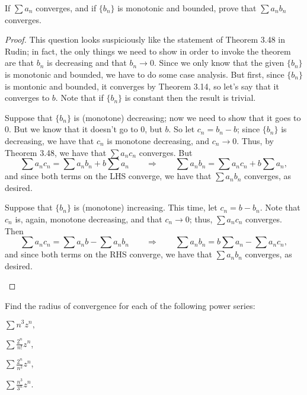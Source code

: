 \documentclass{assignment}
\begin{document}
\begin{question}[8]
  If $\sum a_n$ converges, and if $\{b_n\}$ is monotonic and bounded, prove that $\sum a_n b_n$ converges.
\end{question}
\begin{proof}
  This question looks suspiciously like the statement of Theorem 3.48 in Rudin; in fact, the only 
  things we need to show in order to invoke the theorem are that $b_n$ is decreasing and that $b_n
  \to 0$. Since we only know that the given $\{b_n\}$ is monotonic and bounded, we have to do some
  case analysis. But first, since $\{b_n\}$ is montonic and bounded, it converges by Theorem 3.14, 
  so let's say that it converges to $b$. Note that if $\{b_n\}$ is constant then the result is
  trivial.

  \begin{qparts}
    \item Suppose that $\{b_n\}$ is (monotone) decreasing; now we need to show that it goes to 0. But
      we know that it doesn't go to 0, but $b$. So let $c_n = b_n - b$; since $\{b_n\}$ is decreasing,
      we have that $c_n$ is monotone decreasing, and $c_n \to 0$. Thus, by Theorem 3.48, we have that
      $\sum a_n c_n$ converges. But $$\sum a_n c_n = \sum a_n b_n + b\sum a_n \qquad \Rightarrow
      \qquad \sum a_nb_n = \sum a_n c_n + b\sum a_n,$$ and since both terms on the LHS converge, we
      have that $\sum a_n b_n$ converges, as desired.
    \item Suppose that $\{b_n\}$ is (monotone) increasing. This time, let $c_n = b - b_n$. Note that
      $c_n$ is, again, monotone decreasing, and that $c_n \to 0$; thus, $\sum a_n c_n$ converges.
      Then $$\sum a_n c_n = \sum a_n b - \sum a_n b_n \qquad \Rightarrow \qquad \sum a_nb_n = b\sum
      a_n  - \sum a_n c_n,$$ and since both terms on the RHS converge, we have that $\sum a_nb_n$
      converges, as desired.
  \end{qparts}
\end{proof}


\begin{question}[9]
  Find the radius of convergence for each of the following power series:
\begin{qparts}
  \item $\sum n^3z^n,$ 
  \item $\sum \frac{2^n}{n!}z^n$,
  \item $\sum \frac{2^n}{n^2}z^n$,
  \item $\sum \frac{n^3}{3^n}z^n$.
\end{qparts}
\end{question}
\end{document}

